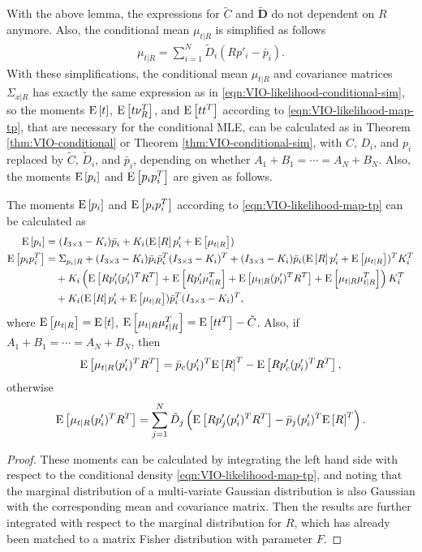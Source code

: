 With the above lemma, the expressions for $\tilde{C}$ and $\tilde{\mathbf{D}}$ do not dependent on $R$ anymore.
Also, the conditional mean $\mu_{t|R}$ is simplified as follows
\begin{align}
	\mu_{t|R} = \sum_{i=1}^N \tilde{D}_i(Rp'_i-\bar{p}_i).
\end{align}
With these simplifications, the conditional mean $\mu_{t|R}$ and covariance matrices $\Sigma_{x|R}$ has exactly the same expression as in \eqref{eqn:VIO-likelihood-conditional-sim}, so the moments $\mathrm{E}\left[ t \right]$, $\mathrm{E}\left[ t\nu_R^T \right]$, and $\mathrm{E}\left[ tt^T \right]$ according to \eqref{eqn:VIO-likelihood-map-tp}, that are necessary for the conditional MLE, can be calculated as in Theorem \ref{thm:VIO-conditional} or Theorem \ref{thm:VIO-conditional-sim}, with $C$, $D_i$, and $p_i$ replaced by $\tilde{C}$, $\tilde{D}_i$, and $\bar{p}_i$, depending on whether $A_1+B_1 = \cdots = A_N+B_N$.
Also, the moments $\mathrm{E}\left[ p_i \right]$ and $\mathrm{E}\left[ p_ip_i^T \right]$ are given as follows.

\begin{theorem} \label{thm:VIO-likelihood-Ep}
	The moments $\mathrm{E}\left[ p_i \right]$ and $\mathrm{E}\left[ p_ip_i^T \right]$ according to \eqref{eqn:VIO-likelihood-map-tp} can be calculated as
	\begin{align}
		\mathrm{E}\left[ p_i \right] &= (I_{3\times 3}-K_i)\bar{p}_i + K_i(\mathrm{E}\left[ R \right]p'_i+\mathrm{E}\left[ \mu_{t|R} \right]) \\
		\mathrm{E}\left[ p_ip_i^T \right] &= \Sigma_{p_i|R} + (I_{3\times 3}-K_i)\bar{p}_i\bar{p}_i^T(I_{3\times 3}-K_i)^T + (I_{3\times 3}-K_i)\bar{p}_i (\mathrm{E}\left[ R \right]p'_i+\mathrm{E}\left[ \mu_{t|R} \right])^TK_i^T \nonumber \\
		&\quad + K_i \left(\mathrm{E}\left[ Rp'_i(p'_i)^TR^T \right] + \mathrm{E}\left[ Rp'_i\mu_{t|R}^T \right] + \mathrm{E}\left[ \mu_{t|R}(p'_i)^TR^T \right] + \mathrm{E}\left[ \mu_{t|R}\mu_{t|R}^T \right]\right) K_i^T \nonumber \\
		&\quad + K_i(\mathrm{E}\left[ R \right]p'_i+\mathrm{E}\left[ \mu_{t|R} \right])\bar{p}_i^T(I_{3\times 3}-K_i)^T,
	\end{align}
	where $\mathrm{E}\left[ \mu_{t|R} \right] = \mathrm{E}\left[ t \right]$, $\mathrm{E}\left[ \mu_{t|R}\mu_{t|R}^T \right] = \mathrm{E}\left[ tt^T \right] - \tilde{C}$.
	Also, if $A_1+B_1 = \cdots = A_N+B_N$, then
	\begin{align}
		\mathrm{E}\left[ \mu_{t|R}(p'_i)^TR^T \right] = \bar{p}_c(p'_i)^T\mathrm{E}\left[ R \right]^T - \mathrm{E}\left[ Rp'_c(p'_i)^TR^T \right],
	\end{align}
	otherwise
	\begin{align}
		\mathrm{E}\left[ \mu_{t|R}(p'_i)^TR^T \right] = \sum_{j=1}^N \tilde{D}_j \left(\mathrm{E}\left[ Rp'_j(p'_i)^TR^T \right] - \bar{p}_j(p'_i)^T\mathrm{E}\left[ R \right]^T\right).
	\end{align}
\end{theorem}
\begin{proof}
	These moments can be calculated by integrating the left hand side with respect to the conditional density \eqref{eqn:VIO-likelihood-map-tp}, and noting that the marginal distribution of a multi-variate Gaussian distribution is also Gaussian with the corresponding mean and covariance matrix.
	Then the results are further integrated with respect to the marginal distribution for $R$, which has already been matched to a matrix Fisher distribution with parameter $F$.
\end{proof}

